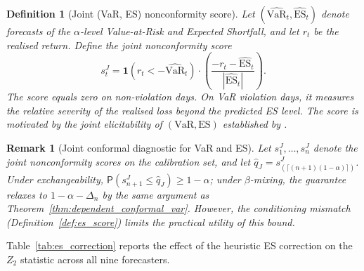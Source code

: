 \documentclass[preprint,11pt,authoryear]{elsarticle}
\newtheorem{definition}[theorem]{Definition}
\newtheorem{remark}[theorem]{Remark}
\newcommand{\VaR}{\mathrm{VaR}}
\newcommand{\ES}{\mathrm{ES}}
\renewcommand{\P}{\mathsf{P}}
\newcommand{\1}{\boldsymbol{1}}
\begin{document}
	\begin{definition}[Joint (VaR, ES) nonconformity score]
		\label{def:joint_score}
		Let $(\widehat{\VaR}_t, \widehat{\ES}_t)$ denote forecasts of the $\alpha$-level Value-at-Risk and Expected Shortfall, and let $r_t$ be the realised return. Define the joint nonconformity score
		\begin{equation}
			s_t^{J} = \1(r_t < -\widehat{\VaR}_t) \cdot
			\left(\frac{-r_t - \widehat{\ES}_t}{|\widehat{\ES}_t|}\right).
			\label{eq:joint_score}
		\end{equation}
		The score equals zero on non-violation days. On VaR violation days, it measures the relative severity of the realised loss beyond the predicted ES level. The score is motivated by the joint elicitability of $(\VaR, \ES)$ established by \citet{fissler2016higher}.
	\end{definition}
	
	\begin{remark}[Joint conformal diagnostic for VaR and ES]
		\label{prop:joint_conformal_var_es}
		Let $s_1^J, \ldots, s_n^J$ denote the joint nonconformity scores on the calibration set, and let
		$\hat{q}_J = s_{(\lceil (n+1)(1-\alpha) \rceil)}^{J}$.
		Under exchangeability, $\P(s_{n+1}^{J} \leq \hat{q}_J) \geq 1 - \alpha$; under $\beta$-mixing, the guarantee relaxes to $1 - \alpha - \Delta_n$ by the same argument as Theorem~\ref{thm:dependent_conformal_var}. However, the conditioning mismatch (Definition~\ref{def:es_score}) limits the practical utility of this bound.
	\end{remark}

	Table~\ref{tab:es_correction} reports the effect of the heuristic ES correction on the $Z_2$ statistic across all nine forecasters.
\end{document}
